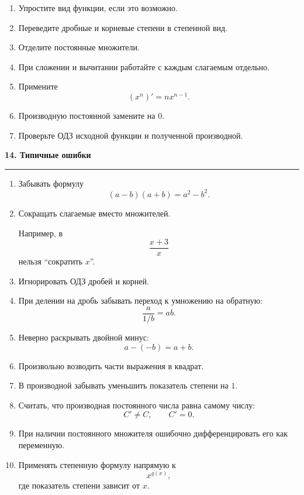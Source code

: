 \documentclass[a4paper,12pt]{article}
\newcommand{\lessonsection}[1]{%
    \vspace{0.5em}
    {\Large\bfseries\color{darkaccent}#1}\par
    \vspace{0.2em}
    {\color{accent}\rule{\linewidth}{0.6pt}}
    \vspace{0.5em}
}
\begin{document}
\begin{enumerate}[label=\arabic*)]
    \item Упростите вид функции, если это возможно.
    \item Переведите дробные и корневые степени в степенной вид.
    \item Отделите постоянные множители.
    \item При сложении и вычитании работайте с каждым слагаемым отдельно.
    \item Примените
    \[
    (x^n)'=nx^{n-1}.
    \]
    \item Производную постоянной замените на \(0\).
    \item Проверьте ОДЗ исходной функции и полученной производной.
\end{enumerate}


\lessonsection{14. Типичные ошибки}

\begin{enumerate}[label=\arabic*)]
    \item Забывать формулу
    \[
    (a-b)(a+b)=a^2-b^2.
    \]

    \item Сокращать слагаемые вместо множителей.

    Например, в
    \[
    \frac{x+3}{x}
    \]
    нельзя ``сократить \(x\)''.

    \item Игнорировать ОДЗ дробей и корней.

    \item При делении на дробь забывать переход к умножению на обратную:
    \[
    \frac{a}{1/b}=ab.
    \]

    \item Неверно раскрывать двойной минус:
    \[
    a-(-b)=a+b.
    \]

    \item Произвольно возводить части выражения в квадрат.

    \item В производной забывать уменьшить показатель степени на \(1\).

    \item Считать, что производная постоянного числа равна самому числу:
    \[
    C'\ne C,
    \qquad
    C'=0.
    \]

    \item При наличии постоянного множителя ошибочно дифференцировать его как переменную.

    \item Применять степенную формулу напрямую к
    \[
    x^{g(x)},
    \]
    где показатель степени зависит от \(x\).
\end{enumerate}
\end{document}
